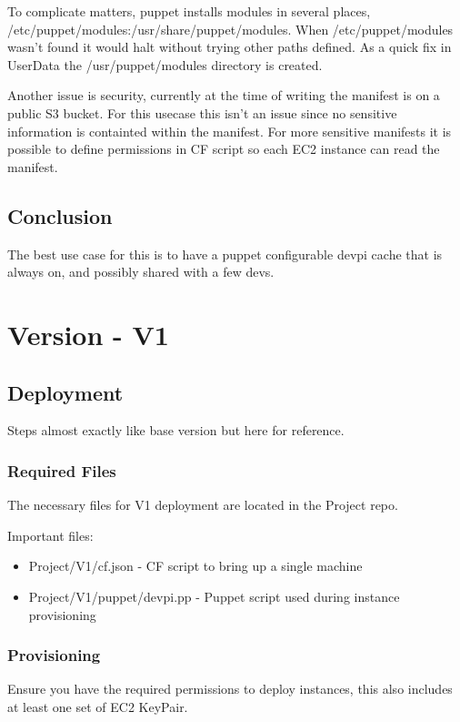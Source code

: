 \documentclass[12pt, letterpaper]{article}
\begin{document}
To complicate matters, puppet installs modules in several places, /etc/puppet/modules:/usr/share/puppet/modules. When 
/etc/puppet/modules wasn't found it would halt without trying other paths defined. As a quick fix in UserData the /usr/puppet/modules
directory is created.

Another issue is security, currently at the time of writing the manifest is on a public S3 bucket. For this usecase this isn't
an issue since no sensitive information is containted within the manifest. For more sensitive manifests it is possible to define 
permissions in CF script so each EC2 instance can read the manifest.

\subsection{Conclusion}
The best use case for this is to have a puppet configurable devpi cache that is always on, and possibly shared with a few devs. 

\section{Version - V1}

\subsection{Deployment}
Steps almost exactly like base version but here for reference.

\subsubsection{Required Files}
The necessary files for V1 deployment are located in the Project repo.

Important files:
\begin{itemize}
    \item Project/V1/cf.json - CF script to bring up a single machine
    \item Project/V1/puppet/devpi.pp - Puppet script used during instance provisioning
\end{itemize}

\subsubsection{Provisioning}
Ensure you have the required permissions to deploy instances, this also includes at least one set of EC2 KeyPair.
\end{document}
